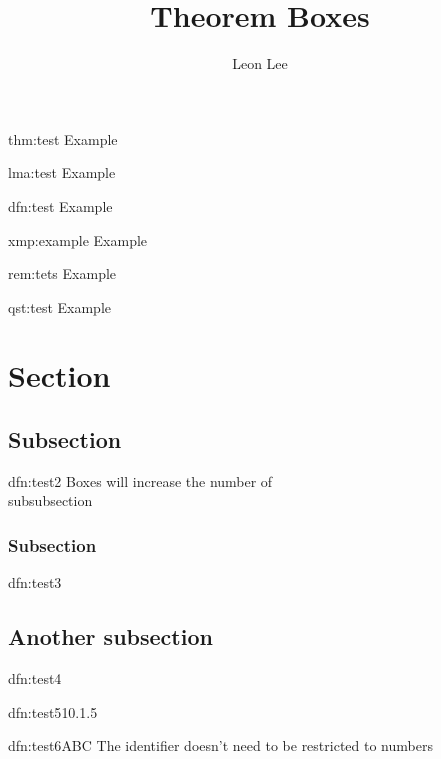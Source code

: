 \documentclass[]{article}
\title{Theorem Boxes}
\author{Leon Lee}
\begin{document}
\maketitle

\begin{thm}[Example]{thm:test}{}
    Example
\end{thm}

\begin{lma}[Example]{lma:test}{}
    Example
\end{lma}

\begin{dfn}[Example]{dfn:test}{}
    Example
\end{dfn}

\begin{xmp}[Example]{xmp:example}{}
    Example
\end{xmp}

\begin{rem}[Example]{rem:tets}{}
    Example
\end{rem}

\begin{qst}[Example]{qst:test}{}
    Example
\end{qst}

\newpage

\section{Section}
\subsection{Subsection}
\begin{dfn}{dfn:test2}{}
    Boxes will increase the number of \\subsubsection
\end{dfn}

\subsubsection{Subsection}

\begin{dfn}{dfn:test3}{}
    
\end{dfn}

\subsection{Another subsection}

\begin{dfn}{dfn:test4}{}
    
\end{dfn}

\begin{dfn}{dfn:test5}{10.1.5}
    
\end{dfn}

\begin{dfn}{dfn:test6}{ABC}
    The identifier doesn't need to be restricted to numbers
\end{dfn}
\end{document}
